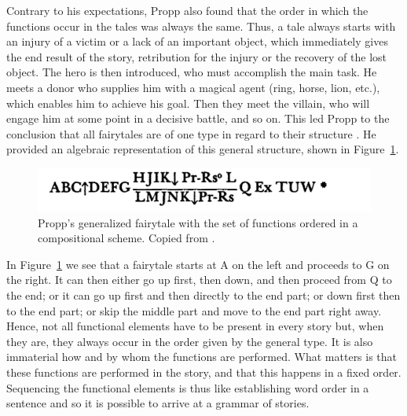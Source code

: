 \documentclass[output=paper]{langscibook}
\begin{document}
Contrary to his expectations, Propp also found that the order in which the functions occur in the tales was always the same. Thus, a tale always starts with an injury of a victim or a lack of an important object, which immediately gives the end result of the story, retribution for the injury or the recovery of the lost object. The hero is then introduced, who must accomplish the main task. He meets a donor who supplies him with a magical agent (ring, horse, lion, etc.), which enables him to achieve his goal. Then they meet the villain, who will engage him at some point in a decisive battle, and so on. This led Propp to the conclusion that all fairytales are of one type in regard to their structure \citep[23]{Propp1968}. He provided an algebraic representation of this general structure, shown in Figure~\ref{fig:karstens:proppfairytale}.

\begin{figure}
    \centering
    \includegraphics[scale=0.55]{figures/Propp.png}
    \caption{Propp's generalized fairytale with the set of functions ordered in a compositional scheme. Copied from \cite[105]{Propp1968}.}
    \label{fig:karstens:proppfairytale}
\end{figure}

In Figure~\ref{fig:karstens:proppfairytale} we see that a fairytale starts at A on the left and proceeds to G on the right. It can then either go up first, then down, and then proceed from Q to the end; or it can go up first and then directly to the end part; or down first then to the end part; or skip the middle part and move to the end part right away. Hence, not all functional elements have to be present in every story but, when they are, they always occur in the order given by the general type. It is also immaterial how and by whom the functions are performed. What matters is that these functions are performed in the story, and that this happens in a fixed order. Sequencing the functional elements is thus like establishing word order in a sentence and so it is possible to arrive at a grammar of stories. 
\end{document}
